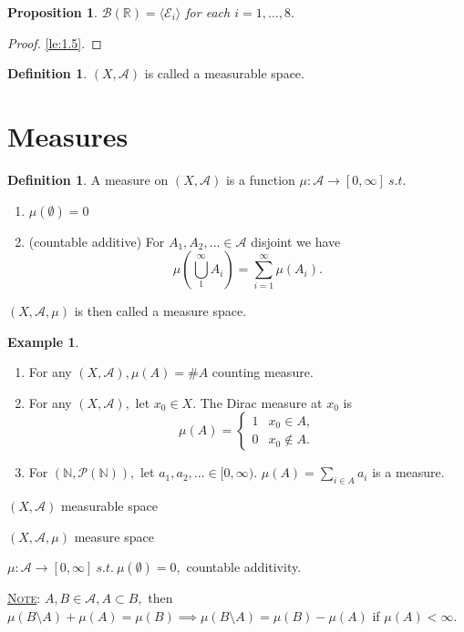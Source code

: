 \documentclass{report}
\newcommand{\R}{\mathbb{R}}
\newcommand{\N}{\mathbb{N}}
\newcommand{\st}{\ s.t.\ }
\newcommand{\fancyem}[1]{\underline{\textsc{#1}}}
\newtheorem{proposition}[theorem]{Proposition}
\theoremstyle{definition}
\newtheorem{definition}[theorem]{Definition}
\newtheorem{example}[theorem]{Example}
\theoremstyle{remark}
\begin{document}
\begin{proposition}
$\mathcal{B}(\R) = \langle\mathcal{E}_i\rangle$ for each $i = 1, \ldots, 8.$ 
\end{proposition}
\begin{proof}
\ref{le:1.5}.
\end{proof}

\begin{definition}
$(X, \mathcal{A})$ is called a measurable space.
\end{definition}


\section{Measures}
\begin{definition}
A measure on $(X, \mathcal{A})$ is a function $\mu: \mathcal{A} \to [0, \infty] \st$
\begin{enumerate}
\item $\mu(\emptyset) = 0$
\item (countable additive) For $A_1, A_2, \ldots \in \mathcal{A}$ disjoint we have
\[
\mu\left(\bigcup_1^\infty A_i \right) = \sum_{i=1}^\infty \mu(A_i).
\]
\end{enumerate}
$(X,  \mathcal{A}, \mu)$ is then called a measure space.
\end{definition}

\begin{example}
\begin{enumerate}
\item For any $(X, \mathcal{A}), \mu(A) = \#A$ counting measure.
\item For any $(X, \mathcal{A}),$ let $x_0 \in X.$ The Dirac measure at $x_0$ is
\[
\mu(A) = \begin{cases}
1 & x_0 \in A, \\
0 & x_0 \notin A.
\end{cases}
\]
\item For $(\N, \mathcal{P}(\N)),$ let $a_1, a_2, \ldots \in [0, \infty).$ $\mu(A) = \sum_{i \in A} a_i$ is a measure.
\end{enumerate}
\end{example}

$(X,  \mathcal{A})$ measurable space

$(X,  \mathcal{A}, \mu)$ measure space

$\mu: \mathcal{A} \to [0, \infty] \st \mu(\emptyset) = 0, $ countable additivity.

\fancyem{Note}: $A, B \in \mathcal{A}, A \subset B, $ then $ \mu(B \setminus A) + \mu(A) = \mu(B) \implies \mu(B \setminus A) = \mu(B) - \mu(A)$ if $\mu(A) < \infty.$
\end{document}
